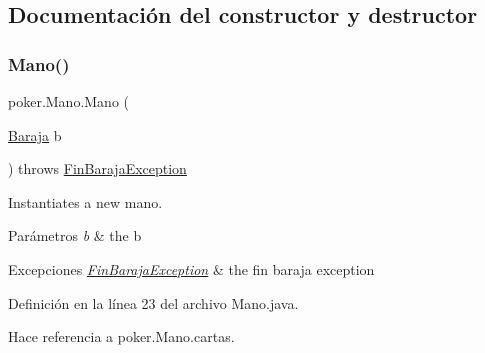 \subsection{Documentación del constructor y destructor}
\mbox{\label{classpoker_1_1Mano_ac89468d484812da476c2a46201eb513e}} 
\subsubsection{\texorpdfstring{Mano()}{Mano()}}
{\footnotesize\ttfamily poker.\+Mano.\+Mano (\begin{DoxyParamCaption}\item[{\mbox{\hyperlink{classpoker_1_1Baraja}{Baraja}}}]{b }\end{DoxyParamCaption}) throws \mbox{\hyperlink{classpoker_1_1FinBarajaException}{Fin\+Baraja\+Exception}}}



Instantiates a new mano. 


\begin{DoxyParams}{Parámetros}
{\em b} & the b \\
\hline
\end{DoxyParams}

\begin{DoxyExceptions}{Excepciones}
{\em \mbox{\hyperlink{classpoker_1_1FinBarajaException}{Fin\+Baraja\+Exception}}} & the fin baraja exception \\
\hline
\end{DoxyExceptions}


Definición en la línea 23 del archivo Mano.\+java.


\begin{DoxyCode}{0}

\end{DoxyCode}


Hace referencia a poker.\+Mano.\+cartas.



